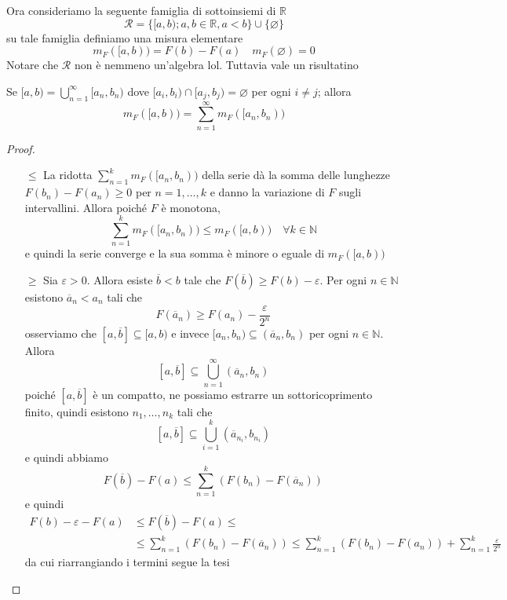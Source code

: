 Ora consideriamo la seguente famiglia di sottoinsiemi di \(\mathbb{R}\) 
\[
    \mathcal{R} = \{[a, b); a, b \in  \mathbb{R}, a < b\} \cup \{\varnothing\} 
\]
su tale famiglia definiamo una misura elementare 
\[
    m_F{([a,b))} = F{(b)} - F{(a)} \quad m_F{(\varnothing)} = 0
\]
Notare che \(\mathcal{R}\) non è nemmeno un'algebra lol. Tuttavia vale un
risultatino
\begin{proposition}
    Se \([a, b) = \bigcup_{n=1}^{\infty}[a_{n}, b_{n})\) dove \([a_{i}, b_{i})
    \cap [a_{j}, b_{j}) = \varnothing\) per ogni \(i \neq j\); allora
    \[
        m_F{([a, b))} = \sum_{n=1}^{\infty} m_F{([a_{n}, b_{n}))}
    \]
\end{proposition}
\begin{proof} \( \) 
\begin{enumerate}[label = \arabic*.]
    \item[\(\le \)] La ridotta \(\sum_{n=1}^{k} m_F{([a_{n}, b_{n}))} \) della
        serie dà la somma delle lunghezze \(F{(b_{n})} - F{(a_{n})} \ge 0\) per
        \(n=1,\dots,k\) e danno la variazione di \(F\) sugli intervallini.
        Allora poiché \(F\) è monotona, 
        \[
            \sum_{n=1}^{k} m_F{([a_{n}, b_{n}))} \le m_F{([a, b))} \quad \forall
            k \in \mathbb{N}
        \]
        e quindi la serie converge e la sua somma è minore o eguale di
        \(m_F{([a,b))}\) 
    \item[\(\ge \)] Sia \(\varepsilon>0\). Allora esiste \(\overline{b} < b\)
        tale che \(F{(\overline{b})}\ge F{(b)}-\varepsilon\). Per ogni \(n \in
        \mathbb{N}\) esistono \(\overline{a}_n < a_{n}\) tali che 
        \[
          F{(\overline{a}_n)} \ge F{(a_{n})} - \frac{\varepsilon}{2^{n}}
        \]
        osserviamo che \([a, \overline{b}] \subseteq [a, b)\)  e invece \([a_{n},
        b_{n}) \subseteq (\overline{a}_{n}, b_{n}) \) per ogni \(n \in \mathbb{N}\). Allora
        \[
            [a, \overline{b}] \subseteq \bigcup_{n=1}^{\infty}(\overline{a}_{n}, b_{n})
        \]
        poiché \([a, \overline{b}]\) è un compatto, ne possiamo estrarre un
        sottoricoprimento finito, quindi esistono \(n_1, \dots, n_k\) tali che
        \[
            [a, \overline{b}] \subseteq \bigcup_{i=1}^{k}(\overline{a}_{n_i}, b_{n_i})
        \]
        e quindi abbiamo
        \[
          F{(\overline{b})} - F{(a)} \le  \sum_{n=1}^{k} {\left( F{(b_{n})} -
          F{(\overline{a}_n)} \right)}  
        \]
        e quindi
        \begin{align*}
            F{(b)} - \varepsilon - F{(a)} &\le F{(\overline{b})} - F{(a)} \le \\
            &\le 
          \sum_{n=1}^{k} {\left( F{(b_{n})} - F{(\overline{a}_n)} \right)} \le
          \sum_{n=1}^{k} {\left( F{(b_{n})} - F{(a_{n})} \right)} +
          \sum_{n=1}^{k} \frac{\varepsilon}{2^{n}}
        \end{align*}
        da cui riarrangiando i termini segue la tesi
\end{enumerate}
\end{proof}
